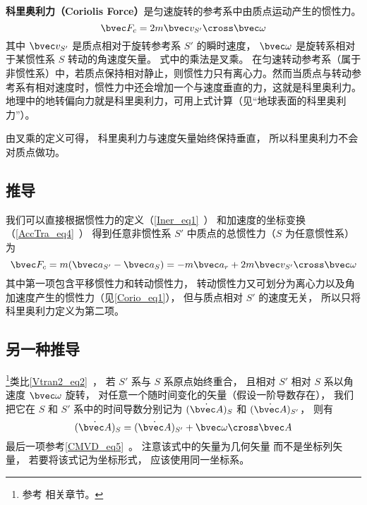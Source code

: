 

\textbf{科里奥利力（Coriolis Force）}是匀速旋转的参考系中由质点运动产生的惯性力。
\begin{equation}
\bvec F_c = 2m \bvec v_{S'} \cross \bvec \omega
\end{equation}
其中 $\bvec v_{S'}$ 是质点相对于旋转参考系 $S'$ 的瞬时速度， $\bvec\omega$ 是旋转系相对于某惯性系 $S$ 转动的角速度矢量。
式中的乘法是叉乘。
在匀速转动参考系（属于非惯性系）中，若质点保持相对静止，则惯性力只有离心力。然而当质点与转动参考系有相对速度时，惯性力中还会增加一个与速度垂直的力，这就是科里奥利力。地理中的地转偏向力就是科里奥利力，可用上式计算（见“地球表面的科里奥利力”）。

由叉乘的定义可得， 科里奥利力与速度矢量始终保持垂直， 所以科里奥利力不会对质点做功。

\subsection{推导}
我们可以直接根据惯性力的定义（\autoref{Iner_eq1}~） 和加速度的坐标变换（\autoref{AccTra_eq4}~） 得到任意非惯性系 $S'$ 中质点的总惯性力（$S$ 为任意惯性系） 为
\begin{equation}
\bvec F_c = m( \bvec a_{S'} - \bvec a_{S} ) = -m\bvec a_{r} + 2 m \bvec v_{S'} \cross  \bvec \omega
\end{equation}
其中第一项包含平移惯性力和转动惯性力， 转动惯性力又可划分为离心力以及角加速度产生的惯性力（见\autoref{Corio_eq1}）， 但与质点相对 $S'$ 的速度无关， 所以只将科里奥利力定义为第二项。

\subsection{另一种推导}\label{Corio_sub1}
\footnote{参考 \cite{Goldstein} 相关章节。}类比\autoref{Vtran2_eq2}~， 若 $S'$ 系与 $S$ 系原点始终重合， 且相对 $S'$ 相对 $S$ 系以角速度 $\bvec\omega$ 旋转， 对任意一个随时间变化的矢量（假设一阶导数存在）， 我们把它在 $S$ 和 $S'$ 系中的时间导数分别记为 $(\dot{\bvec A})_{S}$ 和 $(\dot{\bvec A})_{S'}$， 则有
\begin{equation}\label{Corio_eq4}
(\dot{\bvec A})_{S} = (\dot{\bvec A})_{S'} + \bvec\omega\cross\bvec A
\end{equation}
最后一项参考\autoref{CMVD_eq5}~。 注意该式中的矢量为几何矢量 而不是坐标列矢量， 若要将该式记为坐标形式， 应该使用同一坐标系。

